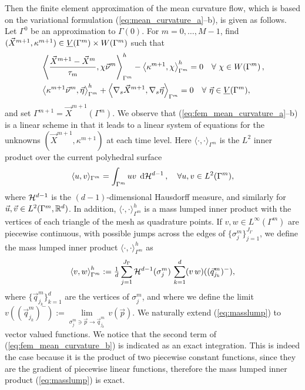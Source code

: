 Then the finite element approximation of the mean curvature flow, which is
based on the variational formulation (\ref{eq:mean_curvature_a}--b), is given
as follows. Let $\Gamma^0$ be an approximation to $\Gamma(0)$. For $m=0,\ldots,
M-1$, find $(\vec{X}^{m+1}, \kappa^{m+1}) \in \underline{V}(\Gamma^m) \times W(\Gamma^m)$
such that
\begin{subequations}
\begin{align}
&\left\langle \frac{\vec{X}^{m + 1} - \vec{X}^{m}}{\tau_m},
\chi\vec{\nu}^m\right\rangle_{\Gamma^m}^h - \left\langle\kappa^{m+1}, \chi
\right\rangle_{\Gamma^m}^h=0\quad \forall\ \chi \in
W(\Gamma^m)\,,\label{eq:fem_mean_curvature_a}\\
&\left\langle\kappa^{m+1}\vec{\nu}^m, \vec{\eta}\right\rangle_{\Gamma^m}^{h} +
\left\langle\nabla_s\vec{X}^{m + 1},
\nabla_s\vec{\eta}\right\rangle_{\Gamma^m}=0\quad \forall\ \vec\eta \in \underline{V}(\Gamma^m),
\label{eq:fem_mean_curvature_b}
\end{align}
\end{subequations}
and set $\Gamma^{m+1} = \vec{X}^{m+1}(\Gamma^m)$. We observe that
(\ref{eq:fem_mean_curvature_a}--b) is a linear scheme in that it leads to a
linear system of equations for the unknowns $(\vec{X}^{m+1}, \kappa^{m+1})$ at
each time level. Here $\langle\cdot,\cdot\rangle_{\Gamma^m}$ is the $L^2$ inner
product over the current polyhedral surface
\begin{equation}
\langle u,v\rangle_{\Gamma^m} =
\int_{\Gamma^m}uv\,\;{\rm d}{\cal H}^{d-1}\,, \quad\forall u,v \in
L^2(\Gamma^m),
\end{equation}
where $\mathcal{H}^{d-1}$ is the $(d-1)$-dimensional Hausdorff measure, and
similarly for $\vec{u},\vec{v}\in L^2(\Gamma^m,{\mathbb R}^d)$. In addition,
$\langle \cdot,\cdot\rangle_{\Gamma^m}^h$ is a mass lumped inner product with
the vertices of each triangle of the mesh as quadrature points. If $v,w \in
L^\infty(\Gamma^m)$ are piecewise continuous, with possible jumps
across the edges of $\{\sigma_j^m\}_{j=1}^{J_\Gamma}$, we define the mass
lumped inner product $\langle\cdot,\cdot\rangle_{\Gamma^m}^h$ as
\begin{equation} \label{eq:masslump}
\left\langle v, w \right\rangle^h_{\Gamma^m} :=
\tfrac1d \sum_{j=1}^{J_\Gamma} \mathcal{H}^{d-1}(\sigma^m_j)\,
\sum_{k=1}^{d} (v\,w)((\vec{q}^m_{j_k})^-),
\end{equation}
where $\{\vec{q}^m_{j_k}\}_{k=1}^{d}$ are the vertices of $\sigma^m_j$, and
where we define the limit $v((\vec{q}^m_{j_k})^-)
:= \underset{\sigma^m_j\ni \vec{p}\to \vec{q}^m_{j_k}}{\lim}\, v(\vec{p})$. We
naturally extend (\ref{eq:masslump}) to vector valued functions. We notice that
the second term of (\ref{eq:fem_mean_curvature_b}) is indicated as an exact
integration. This is indeed the case because it is the product of two
piecewise constant functions, since they are the gradient of piecewise linear
functions, therefore the mass lumped inner product (\ref{eq:masslump}) is
exact.

